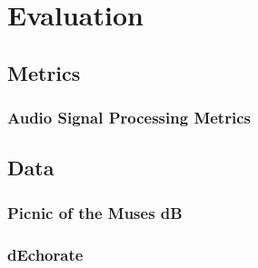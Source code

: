 \chapter{Evaluation}\label{chap:evaluation}

\section{Metrics}
\subsection{Audio Signal Processing Metrics}

\section{Data}
\subsection{Picnic of the Muses dB}
\subsection{dEchorate}


